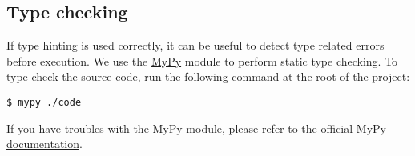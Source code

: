 \subsection{Type checking}
If type hinting is used correctly, it can be useful to detect type related errors before execution. We use the \href{https://mypy.readthedocs.io/en/stable/getting_started.html}{MyPy} module to perform static type checking. To type check the source code, run the following command at the root of the project: 
\begin{codebox}
    \large\texttt{\$ mypy ./code}
\end{codebox}
\begin{tcolorbox}[colback=blue!10!white,colframe=blue!70!black,title=Note]
If you have troubles with the MyPy module, please refer to the \href{https://mypy.readthedocs.io/en/stable/}{official MyPy documentation}.
\end{tcolorbox}